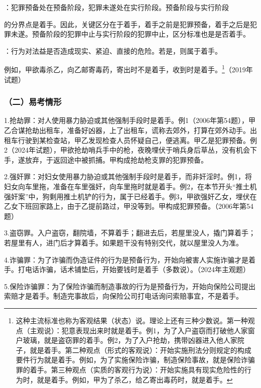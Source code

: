 ：犯罪预备处在预备阶段，犯罪未遂处在实行阶段。预备阶段与实行阶段

的分界点是着手。因此，关键区分在于着手，着手之前是犯罪预备，着手之后是犯罪未遂。预备阶段的犯罪中止与实行阶段的犯罪中止，区分标准也是是否着手。

：行为对法益是否造成现实、紧迫、直接的危险。若是，则属于着手。

例如，甲欲毒杀乙，向乙邮寄毒药，寄出时不是着手，收到时是着手。\footnote{这种主流标准也称为客观结果（状态）说。理论上还有三种少数说。第一种观点（主观说）：犯意表现出来时就是着手。例1，为了入户盗窃而打破他人家窗户玻璃，就是盗窃罪的着手。例2，为了入户抢劫，携带凶器进入他人家院子，就是着手。第二种观点（形式的客观说）：开始实施刑法分则规定的构成要件行为就是着手。例如，为了实施保险诈骗，制造保险事故，就是保险诈骗罪的着手。第三种观点（实质的客观行为说）：开始实施具有现实危险性的行为时，就是着手。例如，甲为了杀乙，给乙寄出毒药时，就是着手。}（2019年试题）

\subsubsection*{（二）易考情形}

1.抢劫罪：对人使用暴力胁迫或其他强制手段时是着手。例1（2006年第54题），甲乙合谋抢劫出租车，准备好凶器，上了出租车，谎称去郊外，打算在郊外动手。出租车行驶到某检查站，甲乙发现检查人员怀疑自己，便逃离。甲乙是犯罪预备。例2（2024年试题），甲欲抢劫哨兵手中的枪，夜晚埋伏于哨兵身后草丛，没有机会下手，遂放弃，于返回途中被抓捕。甲构成抢劫枪支罪的犯罪预备。

2.强奸罪：对妇女使用暴力胁迫或其他强制手段时是着手，而非奸淫时。例1，将妇女向车里拖，准备在车里强奸，向车里拖时就是着手。例2，在本节开头“推土机强奸案”中，狗剩用推土机铲的行为，属于已经着手。例3，甲欲强奸乙女，埋伏在乙女下班回家路上，由于乙提前路过，甲没等到。甲构成犯罪预备。（2006年第54题）

3.盗窃罪。入户盗窃，翻院墙，不算着手；翻进去后，若屋里没人，撬门算着手；若屋里有人，进门后才算着手。如果题干没有特别交代，就以屋里没人为准。

4.诈骗罪：为了诈骗而伪造证件的行为是预备行为，开始向被害人实施诈骗才是着手。打电话诈骗，话术铺垫后，开始要钱时是着手（多数说）。（2024年主观题）

5.保险诈骗罪：为了保险诈骗而制造事故的行为是预备行为，开始向保险公司提出索赔才是着手。制造完事故后，向保险公司打电话询问索赔事宜，不是着手。

